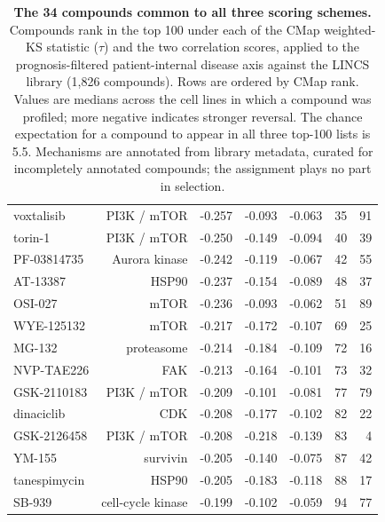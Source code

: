 \begin{table}[!ht]
\begin{tabular*}{\textwidth}{@{\extracolsep{\fill}}lrS[table-format=-1.3]S[table-format=-1.3]S[table-format=-1.3]rr@{}}
voxtalisib & PI3K / mTOR & -0.257 & -0.093 & -0.063 & 35 & 91 \\
torin-1 & PI3K / mTOR & -0.250 & -0.149 & -0.094 & 40 & 39 \\
PF-03814735 & Aurora kinase & -0.242 & -0.119 & -0.067 & 42 & 55 \\
AT-13387 & HSP90 & -0.237 & -0.154 & -0.089 & 48 & 37 \\
OSI-027 & mTOR & -0.236 & -0.093 & -0.062 & 51 & 89 \\
WYE-125132 & mTOR & -0.217 & -0.172 & -0.107 & 69 & 25 \\
MG-132 & proteasome & -0.214 & -0.184 & -0.109 & 72 & 16 \\
NVP-TAE226 & FAK & -0.213 & -0.164 & -0.101 & 73 & 32 \\
GSK-2110183 & PI3K / mTOR & -0.209 & -0.101 & -0.081 & 77 & 79 \\
dinaciclib & CDK & -0.208 & -0.177 & -0.102 & 82 & 22 \\
GSK-2126458 & PI3K / mTOR & -0.208 & -0.218 & -0.139 & 83 & 4 \\
YM-155 & survivin & -0.205 & -0.140 & -0.075 & 87 & 42 \\
tanespimycin & HSP90 & -0.205 & -0.183 & -0.118 & 88 & 17 \\
SB-939 & cell-cycle kinase & -0.199 & -0.102 & -0.059 & 94 & 77 \\
\bottomrule
\end{tabular*}
\caption{\textbf{The 34 compounds common to all three scoring schemes.} Compounds rank in
the top 100 under each of the CMap weighted-KS statistic ($\tau$) and the two correlation
scores, applied to the prognosis-filtered patient-internal disease axis against the LINCS
library (1{,}826 compounds). Rows are ordered by CMap rank. Values are medians across the
cell lines in which a compound was profiled; more negative indicates stronger reversal. The
chance expectation for a compound to appear in all three top-100 lists is 5.5. Mechanisms
are annotated from library metadata, curated for incompletely annotated compounds; the
assignment plays no part in selection.}
\label{tab:compounds}
\end{table}
